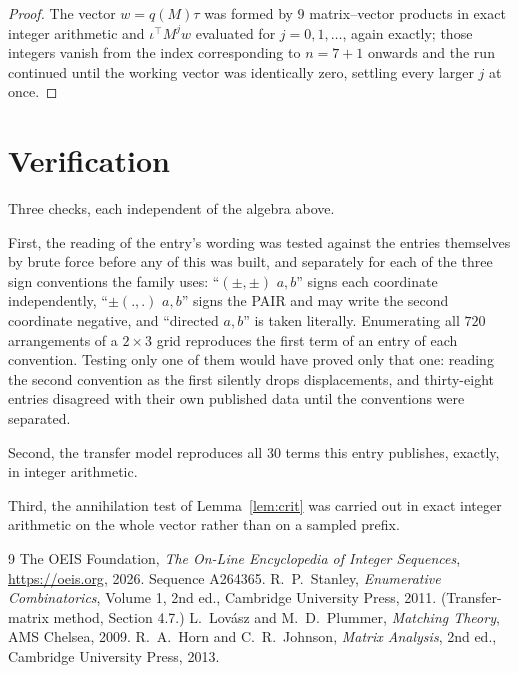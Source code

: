 \documentclass[11pt,a4paper]{article}
\theoremstyle{plain}
\theoremstyle{definition}
\begin{document}
\begin{proof}
The vector $w=q(M)\tau$ was formed by $9$ matrix--vector products in exact integer
arithmetic and $\iota^{\!\top}M^{j}w$ evaluated for $j=0,1,\dots$, again exactly; those
integers vanish from the index corresponding to $n=7+1$ onwards and the run continued
until the working vector was identically zero, settling every larger $j$ at once.
\end{proof}

\section{Verification}

Three checks, each independent of the algebra above.

First, the reading of the entry's wording was tested against the entries themselves by brute
force before any of this was built, and separately for each of the three sign conventions the
family uses: ``$(\pm,\pm)$ $a,b$'' signs each coordinate independently, ``$\pm(.,.)$ $a,b$''
signs the PAIR and may write the second coordinate negative, and ``directed $a,b$'' is taken
literally. Enumerating all $720$ arrangements of a $2\times3$ grid reproduces the first term
of an entry of each convention. Testing only one of them would have proved only that one:
reading the second convention as the first silently drops displacements, and thirty-eight
entries disagreed with their own published data until the conventions were separated.

Second, the transfer model reproduces all $30$ terms this entry publishes, exactly, in
integer arithmetic.

Third, the annihilation test of Lemma~\ref{lem:crit} was carried out in exact integer
arithmetic on the whole vector rather than on a sampled prefix.

\begin{thebibliography}{9}
 The OEIS Foundation, \emph{The On-Line Encyclopedia of Integer
Sequences}, \url{https://oeis.org}, 2026. Sequence A264365.
 R.~P.~Stanley, \emph{Enumerative Combinatorics}, Volume 1, 2nd ed.,
Cambridge University Press, 2011. (Transfer-matrix method, Section 4.7.)
 L.~Lov\'asz and M.~D.~Plummer, \emph{Matching Theory}, AMS Chelsea, 2009.
 R.~A.~Horn and C.~R.~Johnson, \emph{Matrix Analysis}, 2nd ed., Cambridge
University Press, 2013.
\end{thebibliography}
\end{document}
